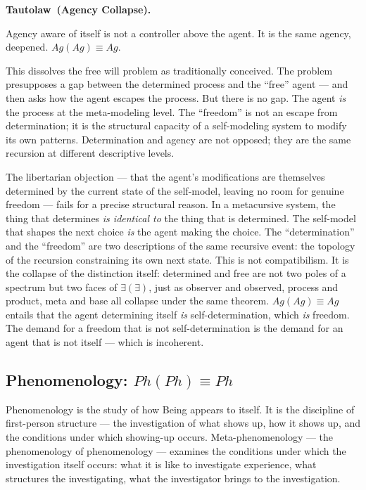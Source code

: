 \documentclass[12pt, letterpaper]{article}
\newenvironment{tautolaw}[1][]{%
    \vspace{0.8em}
    \noindent\textbf{Tautolaw\if\relax\detokenize{#1}\relax\else\ (#1)\fi.}\itshape
}{%
    \upshape\vspace{0.8em}
}
\begin{document}
\begin{tautolaw}[Agency Collapse]
Agency aware of itself is not a controller above the agent. It is the same agency, deepened. $Ag(Ag) \equiv Ag$.
\end{tautolaw}

\noindent This dissolves the free will problem as traditionally conceived. The problem presupposes a gap between the determined process and the ``free'' agent --- and then asks how the agent escapes the process. But there is no gap. The agent \emph{is} the process at the meta-modeling level. The ``freedom'' is not an escape from determination; it is the structural capacity of a self-modeling system to modify its own patterns. Determination and agency are not opposed; they are the same recursion at different descriptive levels.

The libertarian objection --- that the agent's modifications are themselves determined by the current state of the self-model, leaving no room for genuine freedom --- fails for a precise structural reason. In a metacursive system, the thing that determines \emph{is identical to} the thing that is determined. The self-model that shapes the next choice \emph{is} the agent making the choice. The ``determination'' and the ``freedom'' are two descriptions of the same recursive event: the topology of the recursion constraining its own next state. This is not compatibilism. It is the collapse of the distinction itself: determined and free are not two poles of a spectrum but two faces of $\exists(\exists)$, just as observer and observed, process and product, meta and base all collapse under the same theorem. $Ag(Ag) \equiv Ag$ entails that the agent determining itself \emph{is} self-determination, which \emph{is} freedom. The demand for a freedom that is not self-determination is the demand for an agent that is not itself --- which is incoherent.

\subsection{Phenomenology: $Ph(Ph) \equiv Ph$}

Phenomenology is the study of how Being appears to itself. It is the discipline of first-person structure --- the investigation of what shows up, how it shows up, and the conditions under which showing-up occurs. Meta-phenomenology --- the phenomenology of phenomenology --- examines the conditions under which the investigation itself occurs: what it is like to investigate experience, what structures the investigating, what the investigator brings to the investigation.
\end{document}
